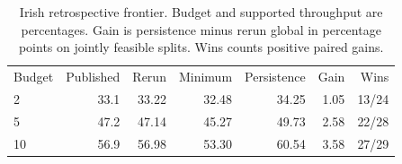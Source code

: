 \begin{table}[!ht]
\centering\small
\caption{Irish retrospective frontier. Budget and supported throughput are percentages. Gain is persistence minus rerun global in percentage points on jointly feasible splits. Wins counts positive paired gains.}
\begin{tabular}{lrrrrrr}
\hline
Budget & Published & Rerun & Minimum & Persistence & Gain & Wins \\
2 & 33.1 & 33.22 & 32.48 & 34.25 & 1.05 & 13/24 \\
5 & 47.2 & 47.14 & 45.27 & 49.73 & 2.58 & 22/28 \\
10 & 56.9 & 56.98 & 53.30 & 60.54 & 3.58 & 27/29 \\
\hline
\end{tabular}
\end{table}
